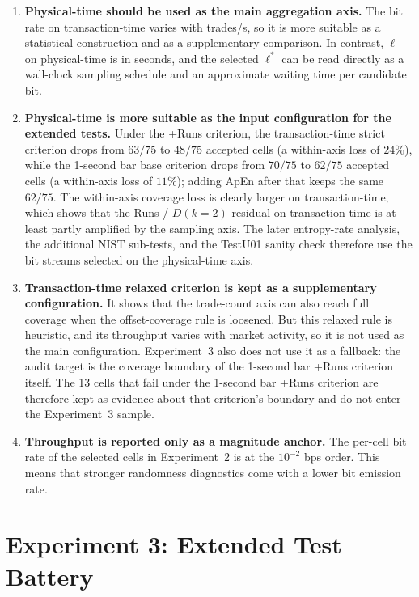 \documentclass[11pt,titlepage,openany,oneside]{book}  %
\begin{document}
\begin{enumerate}
\item \textbf{Physical-time should be used as the main aggregation axis.} The bit rate on transaction-time varies with trades/s, so it is more suitable as a statistical construction and as a supplementary comparison. In contrast, $\ell$ on physical-time is in seconds, and the selected $\ell^*$ can be read directly as a wall-clock sampling schedule and an approximate waiting time per candidate bit.

\item \textbf{Physical-time is more suitable as the input configuration for the extended tests.} Under the +Runs criterion, the transaction-time strict criterion drops from $63/75$ to $48/75$ accepted cells (a within-axis loss of $24\%$), while the 1-second bar base criterion drops from $70/75$ to $62/75$ accepted cells (a within-axis loss of $11\%$); adding ApEn after that keeps the same $62/75$. The within-axis coverage loss is clearly larger on transaction-time, which shows that the Runs / $D(k=2)$ residual on transaction-time is at least partly amplified by the sampling axis. The later entropy-rate analysis, the additional NIST sub-tests, and the TestU01 sanity check therefore use the bit streams selected on the physical-time axis.

\item \textbf{Transaction-time relaxed criterion is kept as a supplementary configuration.} It shows that the trade-count axis can also reach full coverage when the offset-coverage rule is loosened. But this relaxed rule is heuristic, and its throughput varies with market activity, so it is not used as the main configuration. Experiment~3 also does not use it as a fallback: the audit target is the coverage boundary of the 1-second bar +Runs criterion itself. The 13 cells that fail under the 1-second bar +Runs criterion are therefore kept as evidence about that criterion's boundary and do not enter the Experiment~3 sample.

\item \textbf{Throughput is reported only as a magnitude anchor.} The per-cell bit rate of the selected cells in Experiment~2 is at the $10^{-2}$ bps order. This means that stronger randomness diagnostics come with a lower bit emission rate.
\end{enumerate}

\section{Experiment 3: Extended Test Battery}
\label{sec:exp3}
\end{document}
